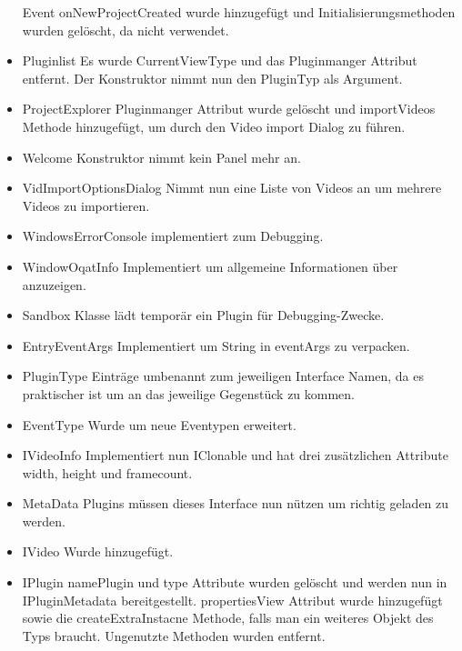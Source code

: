 \begin{itemize}
Event onNewProjectCreated wurde hinzugefügt und Initialisierungsmethoden wurden gelöscht, da nicht verwendet.
\item Pluginlist \newline
Es wurde CurrentViewType und das Pluginmanger Attribut entfernt. Der Konstruktor nimmt nun den PluginTyp als Argument.
\item ProjectExplorer \newline
Pluginmanger Attribut wurde gelöscht und importVideos Methode hinzugefügt, um durch den Video import Dialog zu führen.
\item Welcome \newline
Konstruktor nimmt kein Panel mehr an.
\item VidImportOptionsDialog \newline
Nimmt nun eine Liste von Videos an um mehrere Videos zu importieren.
\item WindowsErrorConsole \newline
implementiert zum Debugging.
\item WindowOqatInfo \newline
Implementiert um allgemeine Informationen über \projektTitel anzuzeigen.
\item Sandbox \newline
Klasse lädt temporär ein Plugin für Debugging-Zwecke.
\item EntryEventArgs \newline
Implementiert um String in eventArgs zu verpacken.
\item PluginType \newline
Einträge umbenannt zum jeweiligen Interface Namen, da es praktischer ist um an das jeweilige Gegenstück zu kommen.
\item EventType \newline
Wurde um neue Eventypen erweitert.
\item IVideoInfo \newline
Implementiert nun IClonable und hat drei zusätzlichen Attribute width, height und framecount.
\item MetaData \newline
Plugins müssen dieses Interface nun nützen um richtig geladen zu werden.
\item IVideo \newline
Wurde hinzugefügt.
\item IPlugin \newline namePlugin und type Attribute wurden gelöscht und werden nun in IPluginMetadata bereitgestellt. propertiesView Attribut wurde hinzugefügt sowie die createExtraInstacne Methode, falls man ein weiteres Objekt des Typs braucht. Ungenutzte Methoden wurden entfernt.

\end{itemize}
